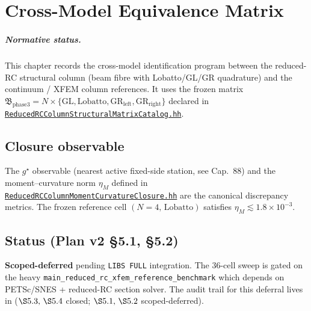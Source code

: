
\chapter{Cross-Model Equivalence Matrix}
\label{ch:cross-model-equivalence-matrix}

\paragraph{Normative status.}
This chapter records the cross-model identification program between
the reduced-RC structural column (beam fibre with Lobatto/GL/GR
quadrature) and the continuum / XFEM column references. It uses the
frozen matrix
\(
  \mathfrak{B}_{\text{phase3}} = N\times\{\mathrm{GL},\mathrm{Lobatto},
  \mathrm{GR}_{\text{left}},\mathrm{GR}_{\text{right}}\}
\)
declared in
\href{run:src/validation/ReducedRCColumnStructuralMatrixCatalog.hh}{%
\texttt{ReducedRCColumnStructuralMatrixCatalog.hh}}.

\section{Closure observable}

The \(g^{\star}\) observable (nearest active fixed-side station, see
Cap.~88) and the moment--curvature norm \(\eta_{M}\) defined in
\href{run:src/validation/ReducedRCColumnMomentCurvatureClosure.hh}{%
\texttt{ReducedRCColumnMomentCurvatureClosure.hh}} are the canonical
discrepancy metrics. The frozen reference cell \((N=4,\,\mathrm{Lobatto})\)
satisfies \(\eta_{M} \lesssim 1.8\times 10^{-3}\).

\section{Status (Plan v2 \S5.1, \S5.2)}

\textbf{Scoped-deferred} pending \texttt{LIBS FULL} integration. The
36-cell sweep is gated on the heavy
\texttt{main\_reduced\_rc\_xfem\_reference\_benchmark} which depends on
PETSc/SNES + reduced-RC section solver. The audit trail for this
deferral lives in
(\(\S5.3,\,\S5.4\) closed; \(\S5.1,\,\S5.2\) scoped-deferred).

